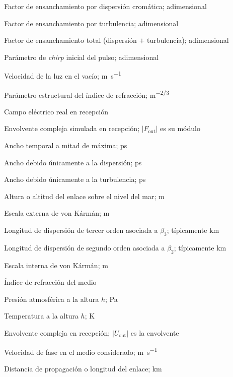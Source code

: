 \begin{description}[
  style=standard,      %
  font=\normalfont,    %
  labelwidth=\symbwidth,
  labelsep=1em,
  leftmargin=!,
  itemsep=2pt
]
\item[$\mathrm{BF}_{\text{disp}}$] Factor de ensanchamiento por dispersión cromática; adimensional
\item[$\mathrm{BF}_{\text{turb}}$] Factor de ensanchamiento por turbulencia; adimensional
\item[$\mathrm{BF}_{\text{total}}$] Factor de ensanchamiento total (dispersión $+$ turbulencia); adimensional
\item[$C$] Parámetro de \textit{chirp} inicial del pulso; adimensional
\item[$c$] Velocidad de la luz en el vacío; \si{\metre\per\second}
\item[$C_{n}^{2}$] Parámetro estructural del índice de refracción; \si{\metre\tothe{-2/3}}
\item[$E_{\text{out}}(t)$] Campo eléctrico real en recepción
\item[$F_{\text{out}}(t)$] Envolvente compleja simulada en recepción; $|F_{\text{out}}|$ es su módulo
\item[$\mathrm{FWHM}$] Ancho temporal a mitad de máxima; \si{\pico\second}
\item[$\mathrm{FWHM}_{\text{disp}}$] Ancho debido únicamente a la dispersión; \si{\pico\second}
\item[$\mathrm{FWHM}_{\text{turb}}$] Ancho debido únicamente a la turbulencia; \si{\pico\second}
\item[$h$] Altura o altitud del enlace sobre el nivel del mar; \si{\metre}
\item[$L_{0}$] Escala externa de von Kármán; \si{\metre}
\item[$L_{D3}$] Longitud de dispersión de tercer orden asociada a $\beta_{3}$; típicamente \si{\kilo\metre}
\item[$L_{D2}$] Longitud de dispersión de segundo orden asociada a $\beta_{2}$; típicamente \si{\kilo\metre}
\item[$l_{0}$] Escala interna de von Kármán; \si{\metre}
\item[$n$] Índice de refracción del medio
\item[$P(h)$] Presión atmosférica a la altura $h$; \si{\pascal}
\item[$T(h)$] Temperatura a la altura $h$; \si{\kelvin}
\item[$U_{\text{out}}(t)$] Envolvente compleja en recepción; $|U_{\text{out}}|$ es la envolvente
\item[$v_\mathrm{f}$] Velocidad de fase en el medio considerado; \si{\metre\per\second}
\item[$z$] Distancia de propagación o longitud del enlace; \si{\kilo\metre}


\end{description}
